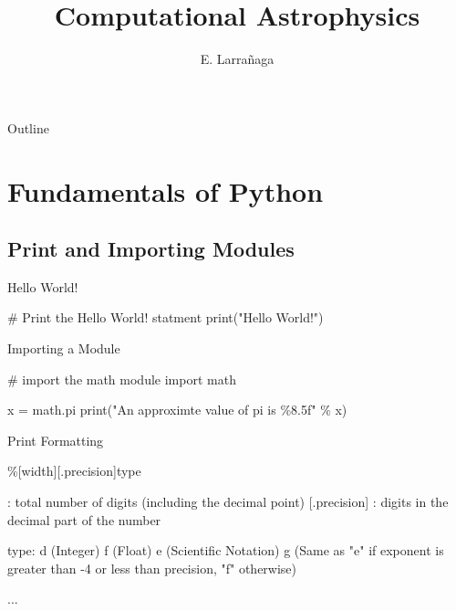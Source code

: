 \documentclass[11pt]{beamer}
\begin{document}
\begin{frame}
\title{Computational Astrophysics}
\author{E. Larrañaga}
\titlepage
\end{frame}

\begin{frame}{Outline}
\tableofcontents
\end{frame}

\section{Fundamentals of Python}

\subsection{Print and Importing Modules}
\begin{frame}[fragile]{Hello World!}
\begin{semiverbatim}
# Print the Hello World! statment
print("Hello World!")
\end{semiverbatim}
\end{frame}

\begin{frame}[fragile]{Importing a Module}
\begin{semiverbatim}
# import the math module
import math

x = math.pi  
print("An approximte value of pi is \%8.5f" \% x)

\end{semiverbatim}
\end{frame}

\begin{frame}[fragile]{Print Formatting}
\footnotesize
\begin{semiverbatim}
\%[width][.precision]type 
\end{semiverbatim}
\pause
\begin{semiverbatim}
[width] : total number of digits (including the decimal point)
[.precision] : digits in the decimal part of the number
\end{semiverbatim}
\pause
\begin{semiverbatim}
type: 
d (Integer)
f (Float)
e (Scientific Notation)
g (Same as "e" if exponent is greater than -4 or less than precision, 
	"f" otherwise)
	
...
\end{semiverbatim}
\end{frame}
\end{document}
